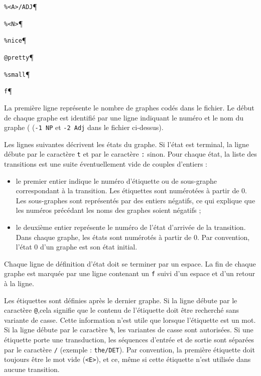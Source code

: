 \verb+%<A>/ADJ+\P

\verb+%<N>+\P

\verb+%nice+\P

\verb+@pretty+\P

\verb+%small+\P

\verb+f+\P

\bigskip
\noindent La première ligne représente le nombre de graphes codés dans le fichier. Le début de
chaque graphe est identifié par une ligne indiquant le numéro et le nom du graphe (
	(\verb+-1 NP+ et \verb+-2 Adj+ dans le fichier ci-dessus).

\bigskip
\noindent Les lignes suivantes décrivent les états du graphe. Si l’état est terminal, la ligne débute par le caractère \verb+t+ et par le caractère \verb+:+ sinon. Pour chaque état, la liste des transitions est une suite éventuellement vide de couples d’entiers :


\begin{itemize}
  \item le premier entier indique le numéro d’étiquette ou de sous-graphe correspondant à la
   transition. Les étiquettes sont numérotées à partir de 0. Les sous-graphes sont représentés par des entiers négatifs, ce qui explique que les numéros précédant les noms
   des graphes soient négatifs ;


  \item le deuxième entier représente le numéro de l’état d’arrivée de la transition. Dans
chaque graphe, les états sont numérotés à partir de 0. Par convention, l’état 0 d’un
graphe est son état initial.


\end{itemize}

\bigskip
\noindent Chaque ligne de définition d’état doit se terminer par un espace. La fin de chaque graphe est marquée par une ligne contenant un \verb+f+ suivi d’un espace et d'un retour à la ligne.

\bigskip
\noindent Les étiquettes sont définies après le dernier graphe. Si la ligne débute par le caractère
\verb+@+,cela signifie que le contenu de l’étiquette doit être recherché sans variante de casse.
Cette information n’est utile que lorsque l’étiquette est un mot. Si la ligne débute par le
caractère \verb+%+, les variantes de casse sont autorisées. Si une étiquette porte une transduction,
les séquences d’entrée et de sortie sont séparées par le caractère
 \verb+/+  (exemple : \verb+the/DET+). Par convention, la première étiquette doit toujours être le
 mot vide (\verb+<E>+), et ce, même si cette étiquette n’est utilisée dans aucune transition.


